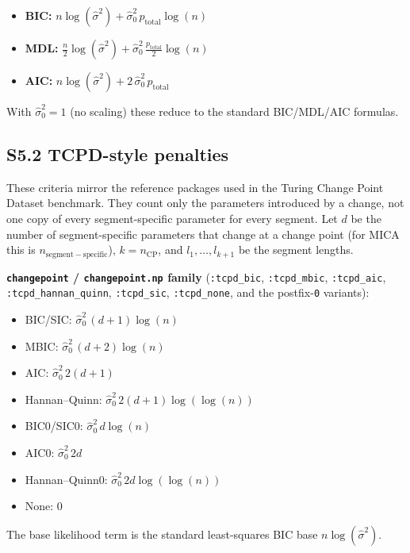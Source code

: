 \documentclass[11pt,a4paper]{article}
\begin{document}
\begin{itemize}
    \item \textbf{BIC:} \(\displaystyle n \log(\widehat{\sigma}^2) + \widehat{\sigma}^2_0 \, p_{\mathrm{total}} \log(n)\)
    \item \textbf{MDL:} \(\displaystyle \frac{n}{2} \log(\widehat{\sigma}^2) + \widehat{\sigma}^2_0 \, \frac{p_{\mathrm{total}}}{2} \log(n)\)
    \item \textbf{AIC:} \(\displaystyle n \log(\widehat{\sigma}^2) + 2 \, \widehat{\sigma}^2_0 \, p_{\mathrm{total}}\)
\end{itemize}

With \(\widehat{\sigma}^2_0 = 1\) (no scaling) these reduce to the standard BIC/MDL/AIC formulas.

\subsection*{S5.2 TCPD-style penalties}

These criteria mirror the reference packages used in the Turing Change Point Dataset benchmark. They count only the parameters introduced by a change, not one copy of every segment-specific parameter for every segment. Let \(d\) be the number of segment-specific parameters that change at a change point (for MICA this is \(n_{\mathrm{segment-specific}}\)), \(k = n_{\mathrm{CP}}\), and \(l_1, \dots, l_{k+1}\) be the segment lengths.

\textbf{\texttt{changepoint} / \texttt{changepoint.np} family} (\texttt{:tcpd\_bic}, \texttt{:tcpd\_mbic}, \texttt{:tcpd\_aic}, \texttt{:tcpd\_hannan\_quinn}, \texttt{:tcpd\_sic}, \texttt{:tcpd\_none}, and the postfix-\texttt{0} variants):
\begin{itemize}
    \item BIC/SIC: \(\widehat{\sigma}^2_0 \, (d+1) \log(n)\)
    \item MBIC: \(\widehat{\sigma}^2_0 \, (d+2) \log(n)\)
    \item AIC: \(\widehat{\sigma}^2_0 \, 2(d+1)\)
    \item Hannan--Quinn: \(\widehat{\sigma}^2_0 \, 2(d+1) \log(\log(n))\)
    \item BIC0/SIC0: \(\widehat{\sigma}^2_0 \, d \log(n)\)
    \item AIC0: \(\widehat{\sigma}^2_0 \, 2d\)
    \item Hannan--Quinn0: \(\widehat{\sigma}^2_0 \, 2d \log(\log(n))\)
    \item None: \(0\)
\end{itemize}
The base likelihood term is the standard least-squares BIC base \(n \log(\widehat{\sigma}^2)\).
\end{document}
